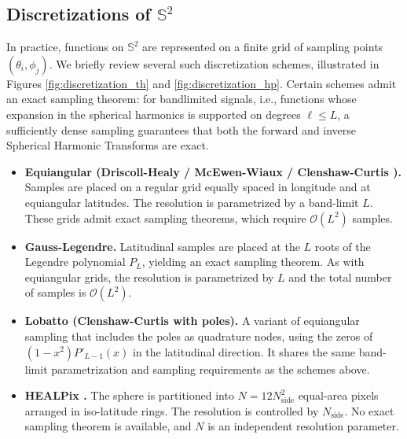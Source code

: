 \documentclass{article}
\theoremstyle{plain}
\theoremstyle{definition}
\theoremstyle{remark}
\renewcommand{\S}{\ensuremath{\mathbb{S}}}
\begin{document}
\subsection{Discretizations of $\S^2$}\label{appendix:discretization_sphere}
In practice, functions on $\mathbb{S}^2$
are represented on a finite grid of sampling points $(\theta_i, \phi_j)$. We briefly review several such discretization schemes, illustrated in Figures \ref{fig:discretization_th} and \ref{fig:discretization_hp}. Certain schemes admit an exact sampling theorem: for bandlimited signals, i.e., functions whose expansion in the spherical harmonics is supported on degrees $\ell \leq L$, a sufficiently dense sampling guarantees that both the forward and inverse Spherical Harmonic Transforms are exact.


\begin{itemize}
	\item \textbf{Equiangular (Driscoll-Healy \cite{driscoll1994computing} / McEwen-Wiaux \cite{mcewen2011novel} / Clenshaw-Curtis \cite{clenshaw1960}).} Samples are placed on a regular grid equally spaced in longitude and at equiangular latitudes. The resolution is parametrized by a band-limit $L$. These grids admit exact sampling theorems, which require $\mathcal{O}(L^2)$ samples.
    
	\item \textbf{Gauss-Legendre.} Latitudinal samples are placed at the $L$ roots of the Legendre polynomial $P_L$, yielding an exact sampling theorem. As with equiangular grids, the resolution is parametrized by $L$ and the total number of samples is $\mathcal{O}(L^2)$.
    
	\item \textbf{Lobatto (Clenshaw-Curtis with poles).} A variant of equiangular sampling that includes the poles as quadrature nodes, using the zeros of $(1-x^2)P'_{L-1}(x)$ in the latitudinal direction. It shares the same band-limit parametrization and sampling requirements as the schemes above.
    
	\item \textbf{HEALPix \cite{gorski2005healpix}.} The sphere is partitioned into $N = 12 N_\mathrm{side}^2$ equal-area pixels arranged in iso-latitude rings. The resolution is controlled by $N_\mathrm{side}$. No exact sampling theorem is available, and $N$ is an independent resolution parameter.
\end{itemize}
\end{document}
